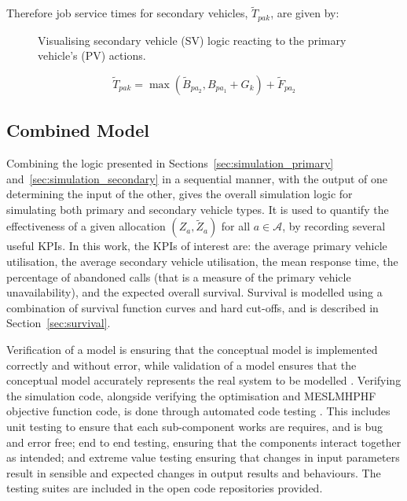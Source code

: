 \documentclass[numbers,webpdf,imaman]{ima-authoring-template}%
\begin{document}
Therefore job service times for secondary vehicles, $\tilde{T}_{pak}$, are
given by:

\begin{figure}
    \centering
    
    \caption{Visualising secondary vehicle (SV) logic reacting to the primary
    vehicle's (PV) actions.}
    \label{fig:sequential_logic}
\end{figure}

\begin{equation}
  \tilde{T}_{pak} = \max\left(\tilde{B}_{pa_2}, B_{pa_1} + G_k \right) + \tilde{F}_{pa_2}
\end{equation}

\subsection{Combined Model}\label{sec:combined_model}
Combining the logic presented in Sections~\ref{sec:simulation_primary}
and~\ref{sec:simulation_secondary} in a sequential manner, with the output of
one determining the input of the other, gives the overall simulation logic for
simulating both primary and secondary vehicle types. It is used to quantify
the effectiveness of a given allocation $(Z_a, \tilde{Z}_a)$ for all
$a \in \mathcal{A}$, by recording several useful KPIs.
In this work, the KPIs of interest are: the average primary vehicle
utilisation, the average secondary vehicle utilisation, the mean response
time, the percentage of abandoned calls (that is a measure of the primary
vehicle unavailability), and the expected overall survival. Survival is
modelled using a combination of survival function curves and hard cut-offs,
and is described in Section~\ref{sec:survival}.

Verification of a model is ensuring that the conceptual model is implemented
correctly and without error, while validation of a model ensures that the
conceptual model accurately represents the real system to be modelled
\citep{robinson2014simulation}. Verifying the simulation code, alongside
verifying the optimisation and MESLMHPHF objective function code, is done
through automated code testing \citep{percival2014test, palmer2023implementing}.
This includes unit testing to ensure that each sub-component works are requires,
and is bug and error free; end to end testing, ensuring that the components
interact together as intended; and extreme value testing ensuring that changes
in input parameters result in sensible and expected changes in output results
and behaviours. The testing suites are included in the open code repositories
provided.
\end{document}
